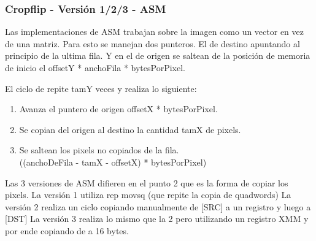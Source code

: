 \subsubsection{Cropflip - Versión 1/2/3 - ASM}

Las implementaciones de ASM trabajan sobre la imagen como un vector en vez de una matriz.
Para esto se manejan dos punteros. El de destino apuntando al principio de la ultima fila. 
Y en el de origen se saltean de la posición de memoria de inicio el offsetY * anchoFila * bytesPorPixel.

El ciclo de repite tamY veces y realiza lo siguiente:
\begin{enumerate}

\item Avanza el puntero de origen offsetX * bytesPorPixel.
\item Se copian del origen al destino la cantidad tamX de pixels.
\item Se saltean los pixels no copiados de la fila. 
	{\\ ((anchoDeFila - tamX - offsetX) * bytesPorPixel)}

\end{enumerate}

Las 3 versiones de ASM difieren en el punto 2 que es la forma de copiar los pixels. 
La versión 1 utiliza rep movsq (que repite la copia de quadwords)
La versión 2 realiza un ciclo copiando manualmente de [SRC] a un registro y luego a [DST]
La versión 3 realiza lo mismo que la 2 pero utilizando un registro XMM y por ende copiando de a 16 bytes.